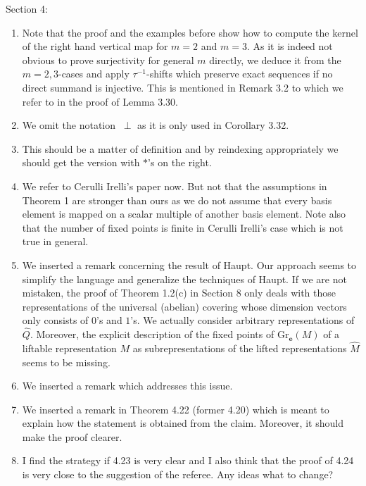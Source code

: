 \documentclass[titlepage,11pt,a4paper]{{scrartcl}}
\begin{document}
Section 4:
\begin{enumerate}
\renewcommand{\labelenumi}{(\arabic{enumi})}
\item Note that the proof and the examples before show how to compute the kernel of the right hand vertical map for $m=2$ and $m=3$. As it is indeed not obvious to prove surjectivity for general $m$ directly, we deduce it from the $m=2,3$-cases and apply $\tau^{-1}$-shifts which preserve exact sequences if no direct summand is injective. This is mentioned in Remark 3.2 to which we refer to in the proof of Lemma 3.30.
\item We omit the notation $~\perp$ as it is only used in Corollary 3.32.
\item This should be a matter of definition and by reindexing appropriately we should get the version with $\ast$'s on the right.
\item We refer to Cerulli Irelli's paper now. But not that the assumptions in Theorem 1 are stronger than ours as we do not assume that every basis element is mapped on a scalar multiple of another basis element. Note also that the number of fixed points is finite in Cerulli Irelli's case which is not true in general.
\item We inserted a remark concerning the result of Haupt. Our approach seems to simplify the language and generalize the techniques of Haupt. If we are not mistaken, the proof of Theorem 1.2(c) in Section 8 only deals with those representations of the universal (abelian) covering whose dimension vectors only consists of $0$'s and $1$'s. We actually consider arbitrary representations of $\hat Q$. Moreover, the explicit description of the fixed points of $\mathrm{Gr}_{\mathbf{e}}(M)$ of a liftable representation $M$ as subrepresentations of the lifted representations $\hat M$ seems to be missing.  

\item We inserted a remark which addresses this issue.
\item We inserted a remark in Theorem 4.22 (former 4.20) which is meant to explain how the statement is obtained from the claim. Moreover, it should make the proof clearer.
\item I find the strategy if 4.23 is very clear and I also think that the proof of 4.24 is very close to the suggestion of the referee. Any ideas what to change?
\end{enumerate}
\end{document}
